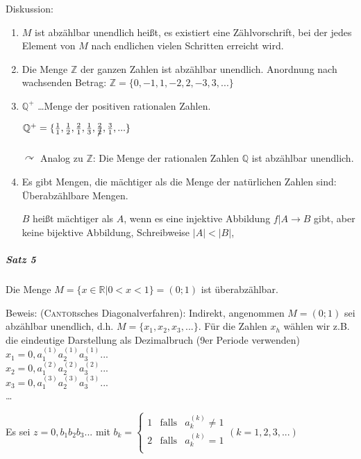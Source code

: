 \documentclass[a4paper]{scrartcl}
\begin{document}
Diskussion:
\begin{enumerate}
\item $M$ ist abzählbar unendlich heißt, es existiert eine Zählvorschrift, bei der jedes Element von $M$ nach endlichen vielen Schritten erreicht wird.
\item Die Menge $\mathbb{Z}$ der  ganzen Zahlen ist abzählbar unendlich. 
Anordnung nach wachsenden Betrag: $\mathbb{Z}=\{0,-1,1,-2,2,-3,3,...\}$
\item $\mathbb{Q}^+$ \dots Menge der positiven rationalen Zahlen.

$\mathbb{Q}^+ = \{ \frac{1}{1}, \frac{1}{2}, \frac{2}{1},\frac{1}{3},\xout{\frac{2}{2}},\frac{3}{1}, ...\}$

$\curvearrowright$ Analog zu $\mathbb{Z}$: Die Menge der rationalen Zahlen $\mathbb{Q}$ ist abzählbar unendlich.

\item Es gibt Mengen, die mächtiger als die Menge der natürlichen Zahlen sind: Überabzählbare Mengen.

$B$ heißt mächtiger als $A$, wenn es eine injektive Abbildung $f|A \rightarrow B$ gibt, aber keine bijektive Abbildung, Schreibweise $\lvert A \rvert < \lvert B \rvert$, 

\end{enumerate}

\subparagraph{Satz 5} Die Menge $M=\{ x \in \mathbb{R} |0 < x <1\} = (0;1)$ ist überabzählbar.

Beweis: (\textsc{Cantor}sches Diagonalverfahren): Indirekt, angenommen $M=(0;1)$ sei abzählbar unendlich, d.h. $M=\{ x_1,x_2,x_3,...\} $. Für die Zahlen $x_h$ wählen wir z.B. die eindeutige Darstellung als Dezimalbruch (9er Periode verwenden)\\
$ x_1 = 0,a_1^{(1)} a_2^{(1)} a_3^{(1)} ...$\\
$x_2 = 0,a_1^{(2)} a_2^{(2)} a_3^{(2)} ...$\\
$x_3 = 0,a_1^{(3)} a_2^{(3)} a_3^{(3)} ...$\\
\dots

Es sei $z=0,b_1 b_2 b_3 ...$
mit $b_k =\left\{ \begin{array}{rcl}
         1
         & \mbox{falls}
         & a_k^{(k)} \neq 1 \\ 
         2  
         & \mbox{falls} 
         & a_k^{(k)} = 1 \\
                \end{array}\right. (k=1,2,3,...)$
\end{document}
